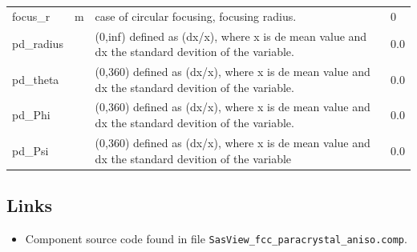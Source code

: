 \begin{longtable}{p{}p{}p{}p{}}
focus\_r & m & case of circular focusing, focusing radius. & 0 \\
pd\_radius &  & (0,inf) defined as (dx/x), where x is de mean value and dx the standard devition of the variable. & 0.0 \\
pd\_theta &  & (0,360) defined as (dx/x), where x is de mean value and dx the standard devition of the variable. & 0.0 \\
pd\_Phi &  & (0,360) defined as (dx/x), where x is de mean value and dx the standard devition of the variable. & 0.0 \\
pd\_Psi &  & (0,360) defined as (dx/x), where x is de mean value and dx the standard devition of the variable & 0.0 \\
\bottomrule
\end{longtable}

\subsection*{Links}
\begin{itemize}
  \item Component source code found in file \texttt{SasView\_fcc\_paracrystal\_aniso.comp}.
\end{itemize}

